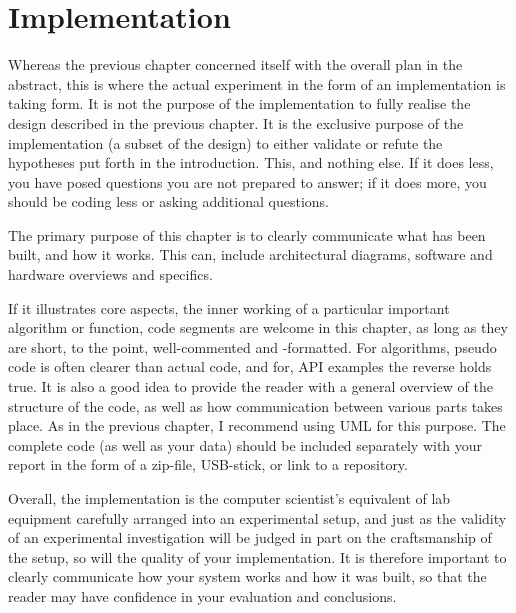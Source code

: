 \chapter{Implementation}
\label{cha:implementation}

Whereas the previous chapter concerned itself with the overall plan in the
abstract, this is where the actual experiment in the form of an
implementation is taking form.  It is not the purpose of the implementation
to fully realise the design described in the previous chapter. It is the
exclusive purpose of the implementation (a subset of the design) to either
validate or refute the hypotheses put forth in the introduction. This, and
nothing else. If it does less, you have posed questions you are not prepared
to answer; if it does more, you should be coding less or asking additional
questions.

The primary purpose of this chapter is to clearly communicate what has been
built, and how it works. This can, \eg include architectural diagrams,
software and hardware overviews and specifics.

If it illustrates core aspects, \eg the inner working of a particular
important algorithm or function, code segments are welcome in this chapter,
as long as they are short, to the point, well-commented and -formatted.  For
algorithms, pseudo code is often clearer than actual code, and for, \eg
\acs{API} examples the reverse holds true.  It is also a good idea to
provide the reader with a general overview of the structure of the code, as
well as how communication between various parts takes place.  As in the
previous chapter, I recommend using \ac{UML} for this purpose.  The complete
code (as well as your data) should be included separately with your report
in the form of a zip-file, USB-stick, or link to a repository.

Overall, the implementation is the computer scientist's equivalent of lab
equipment carefully arranged into an experimental setup, and just as the
validity of an experimental investigation will be judged in part on the
craftsmanship of the setup, so will the quality of your implementation. It
is therefore important to clearly communicate how your system works and how
it was built, so that the reader may have confidence in your evaluation and
conclusions.



